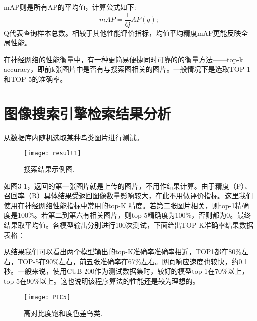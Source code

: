 \documentclass[bachelor_p]{hdu-thesis}
\begin{document}
mAP则是所有AP的平均值，计算公式如下:
\begin{equation}
  mAP = \frac{1}{Q}AP(q);
\end{equation}
Q代表查询样本总数。相较于其他性能评价指标，均值平均精度mAP更能反映全局性能。

在神经网络的性能衡量中，有一种更简易便捷同时可靠的的衡量方法——top-k accuracy，即前k张图片中是否有与搜索图相关的图片。一般情况下是选取TOP-1和TOP-5的准确率。

\section{图像搜索引擎检索结果分析}

从数据库内随机选取某种鸟类图片进行测试。
\begin{figure}[!htb]
  \centering
  \texttt{[image: result1]}
  \caption{搜索结果示例图.}
  \label{fig_result1}
\end{figure}

如图3-1，返回的第一张图片就是上传的图片，不用作结果计算。由于精度（P）、召回率（R）具体结果受返回图像数量影响较大，在此不用做评价指标。这里我们使用在神经网络性能指标中常用的top-K 精度。若第二张图片相关，则top-1精确度是100$\%$。若第二到第六有相关图片，则top-5精确度为100$\%$，否则都为0。最终结果取平均值。各模型输出分别进行100次测试，下面给出TOP-K准确率结果数据表格：

\begin{table}[h]
  \caption{检索结果表格}
\centering
{}
\label{gra_process}
\end{table}

从结果我们可以看出两个模型输出的top-K准确率准确率相近，TOP1都在80$\%$左右，TOP-5在90$\%$左右，前五张准确率在67$\%$左右。网页响应速度也较快，约0.1秒。一般来说，使用CUB-200作为测试数据集时，较好的模型top-1在70$\%$以上，top-5在90$\%$以上。这也说明该程序算法的性能还是较为理想的。

\begin{figure}[!htb]
  \centering
  \texttt{[image: PIC5]}
  \caption{高对比度饱和度色差鸟类.}
  \label{fig_PIC5}
\end{figure}
\end{document}
